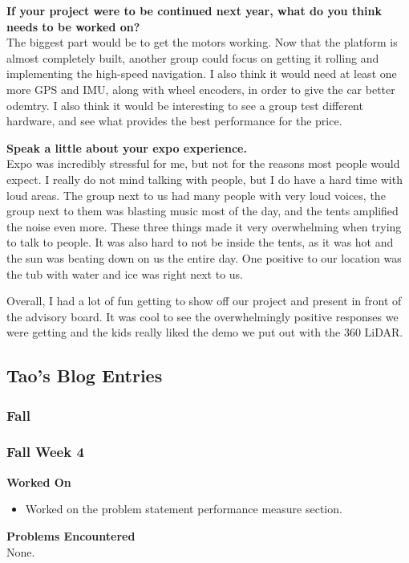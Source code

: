 \documentclass[compsoc,draftclsnofoot,onecolumn,10pt]{IEEEtran}
\begin{document}
\textbf{If your project were to be continued next year, what do you think needs to be worked on?}\\
The biggest part would be to get the motors working. Now that the platform is almost completely built, another group could focus on getting it rolling and implementing the high-speed navigation. I also think it would need at least one more GPS and IMU, along with wheel encoders, in order to give the car better odemtry. I also think it would be interesting to see a group test different hardware, and see what provides the best performance for the price. 

\textbf{Speak a little about your expo experience.}\\
Expo was incredibly stressful for me, but not for the reasons most people would expect. I really do not mind talking with people, but I do have a hard time with loud areas. The group next to us had many people with very loud voices, the group next to them was blasting music most of the day, and the tents amplified the noise even more. These three things made it very overwhelming when trying to talk to people. It was also hard to not be inside the tents, as it was hot and the sun was beating down on us the entire day. One positive to our location was the tub with water and ice was right next to us. 

Overall,  I had a lot of fun getting to show off our project and present in front of the advisory board. It was cool to see the overwhelmingly positive responses we were getting and the kids really liked the demo we put out with the 360 LiDAR. \par



\subsection{Tao's Blog Entries}

\subsubsection{Fall}

\subsubsection*{Fall Week 4}
\textbf{Worked On}
\begin{itemize}
  \item Worked on the problem statement performance measure section.
\end{itemize}
\textbf{Problems Encountered}\\
None.
\end{document}

